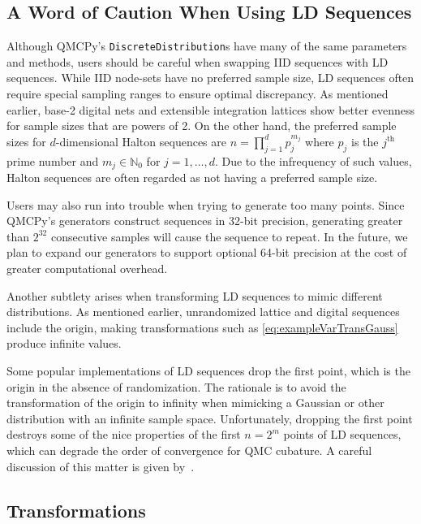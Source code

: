 \documentclass[graybox]{svmult}
\begin{document}
\subsection{A Word of Caution When Using LD Sequences}

Although QMCPy's \texttt{DiscreteDistribution}s have many of the same parameters and methods, users should be careful when swapping IID sequences with LD sequences. While IID node-sets have no preferred sample size, LD sequences often require special sampling ranges to ensure optimal discrepancy. As mentioned  earlier, base-2 digital nets and extensible integration lattices show better evenness for sample sizes that are powers of 2. On the other hand, the preferred sample sizes for $d$-dimensional Halton sequences are $n = \prod_{j=1}^d p^{m_j}_j$ where $p_j$ is the $j^{\text{th}}$ prime number and $m_j \in \mathbb{N}_0$ for $j=1,\dots,d$. Due to the infrequency of such values, Halton sequences are often regarded as not having a preferred sample size.  

Users may also run into trouble when trying to generate too many points. Since QMCPy's generators construct sequences in 32-bit precision, generating greater than $2^{32}$ consecutive samples will cause the sequence to repeat. In the future, we plan to expand our generators to support optional 64-bit precision at the cost of greater computational overhead.

Another subtlety arises when transforming LD sequences to mimic different distributions. As mentioned earlier, unrandomized lattice and digital sequences include the origin, making transformations such as \eqref{eq:exampleVarTransGauss} produce infinite values.  

Some popular implementations of LD sequences drop the first point, which is the origin in the absence of randomization.  The rationale is to avoid the transformation of the origin to infinity when mimicking a Gaussian or other distribution with an infinite sample space.  Unfortunately, dropping the first point destroys some of the nice properties of the first $n = 2^m$ points of LD sequences, which can degrade the order of convergence for QMC cubature. A careful  discussion of this matter is given by~\cite{owen2020dropping}.

\subsection{Transformations}
\end{document}
